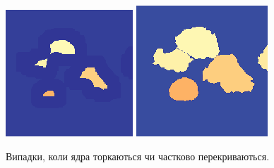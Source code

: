 \begin{figure}[t!]
	\includegraphics[width=0.97\linewidth]{Figures/Chapter2/6b4.png}	
	\includegraphics[width=0.97\linewidth]{Figures/Chapter2/6c4.png}
	\endminipage\hfill
	
	\caption{Випадки, коли ядра торкаються чи частково перекриваються.}
	\label{fig:amazing_segmentation}
\end{figure}

